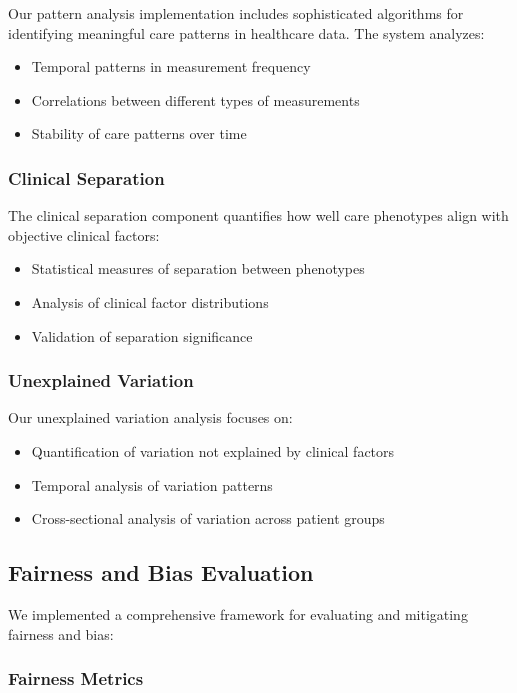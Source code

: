 \documentclass[12pt]{article}
\begin{document}
Our pattern analysis implementation includes sophisticated algorithms for identifying meaningful care patterns in healthcare data. The system analyzes:
\begin{itemize}
    \item Temporal patterns in measurement frequency
    \item Correlations between different types of measurements
    \item Stability of care patterns over time
\end{itemize}

\subsubsection{Clinical Separation}

The clinical separation component quantifies how well care phenotypes align with objective clinical factors:
\begin{itemize}
    \item Statistical measures of separation between phenotypes
    \item Analysis of clinical factor distributions
    \item Validation of separation significance
\end{itemize}

\subsubsection{Unexplained Variation}

Our unexplained variation analysis focuses on:
\begin{itemize}
    \item Quantification of variation not explained by clinical factors
    \item Temporal analysis of variation patterns
    \item Cross-sectional analysis of variation across patient groups
\end{itemize}

\subsection{Fairness and Bias Evaluation}

We implemented a comprehensive framework for evaluating and mitigating fairness and bias:

\subsubsection{Fairness Metrics}
\end{document}
